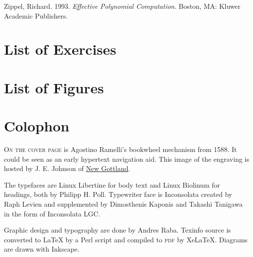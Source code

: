 \documentclass[oneside]{book}
\newcommand{\acronym}[1]{\textsc{\MakeLowercase{#1}}}
\begin{document}
 \label{Zippel 1993}
Zippel, Richard.  1993.  \textit{Effective Polynomial Computation}.  Boston, MA:
Kluwer Academic Publishers.

\label{List of Exercises}
\chapter*{List of Exercises}



\label{List of Figures}
\chapter*{List of Figures}



\printindex

\chapter*{Colophon}
\label{Colophon}

\lettrine[lraise=-0.03,loversize=0.08]{O}{n the cover page} is Agostino Ramelli's bookwheel mechanism from 1588. It could be seen as an early hypertext navigation aid. This image of the engraving is hosted by J. E. Johnson of \href{http://newgottland.com/2012/02/09/before-the-ereader-there-was-the-wheelreader/ramelli_bookwheel_1032px/}{New Gottland}. 

The typefaces are Linux Libertine for body text and Linux Biolinum for headings, both by Philipp H. Poll. Typewriter face is Inconsolata created by Raph Levien and supplemented by Dimosthenis Kaponis and Takashi Tanigawa in the form of Inconsolata LGC. 

Graphic design and typography are done by Andres Raba. Texinfo source is converted to LaTeX by a Perl script and compiled to \acronym{PDF} by XeLaTeX. Diagrams are drawn with Inkscape.
\end{document}

